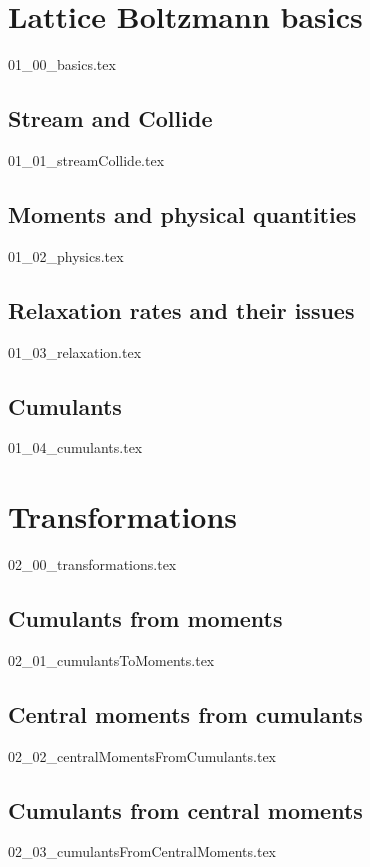 \documentclass[12pt,a4paper,twoside]{article}
\begin{document}
\section{Lattice Boltzmann basics}
\label{sec: Lattice Boltzmann basics}
{01_00_basics.tex}

\subsection{Stream and Collide}
\label{sub: Stream and Collide}
{01_01_streamCollide.tex}

\subsection{Moments and physical quantities}
\label{sub: Moments and physical quantities}
{01_02_physics.tex}

\subsection{Relaxation rates and their issues}
\label{sub: Relaxation rates and their issues}
{01_03_relaxation.tex}

\subsection{Cumulants}
\label{sub: Cumulants}
{01_04_cumulants.tex}

\newpage
\section{Transformations}
\label{sec: Transformations}
{02_00_transformations.tex}

\subsection{Cumulants from moments}
\label{sub: Cumulants from moments}
{02_01_cumulantsToMoments.tex}

\subsection{Central moments from cumulants}
\label{sub: Central moments from cumulants}
{02_02_centralMomentsFromCumulants.tex}

\subsection{Cumulants from central moments}
\label{sub: Cumulants from central moments}
{02_03_cumulantsFromCentralMoments.tex}
\end{document}
